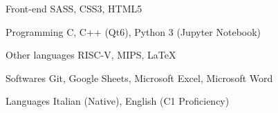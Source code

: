 

\begin{cvskills}

  \cvskill
    {Front-end} %
    {SASS, CSS3, HTML5} %

  \cvskill
    {Programming} %
    {C, C++ (Qt6), Python 3 (Jupyter Notebook)} %

  \cvskill
    {Other languages} %
    {RISC-V, MIPS, LaTeX} %

  \cvskill
    {Softwares} %
    {Git, Google Sheets, Microsoft Excel, Microsoft Word} %

  \cvskill
    {Languages} %
    {Italian (Native), English (C1 Proficiency)} %

\end{cvskills}
